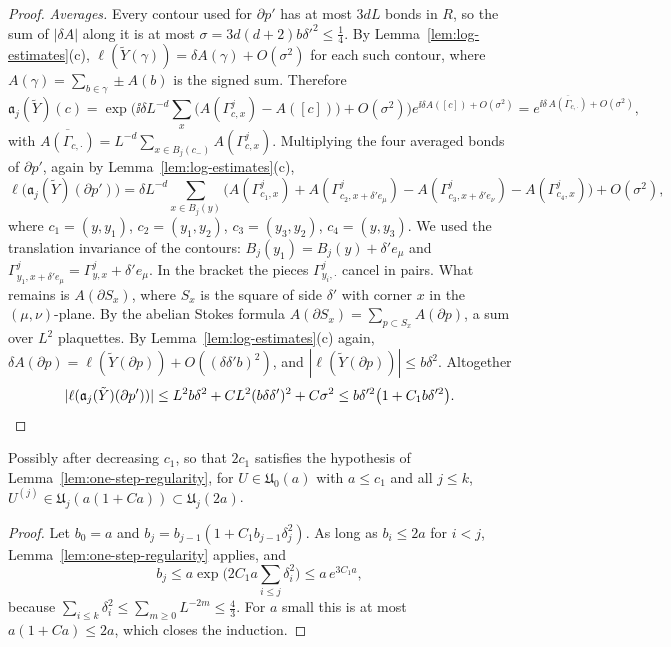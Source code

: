 \begin{proof}
\emph{Averages.} Every contour used for $\partial p'$ has at most $3dL$ bonds in $R$, so the sum of $|\delta A|$ along it is at most $\sigma=3d(d+2)b\delta'^2\le\frac14$. By Lemma~\ref{lem:log-estimates}(c), $\ell(\tilde Y(\gamma))=\delta A(\gamma)+O(\sigma^2)$ for each such contour, where $A(\gamma)=\sum_{b\in\gamma}\pm A(b)$ is the signed sum. Therefore
\[
\mathfrak a_j(\tilde Y)(c)=\exp\Big(\ii\delta L^{-d}\sum_{x}\big(A(\Gamma^j_{c,x})-A([c])\big)+O(\sigma^2)\Big)e^{\ii\delta A([c])+O(\sigma^2)}=e^{\ii\delta\,\overline{A(\Gamma_{c,\cdot})}+O(\sigma^2)},
\]
with $\overline{A(\Gamma_{c,\cdot})}=L^{-d}\sum_{x\in B_j(c_-)}A(\Gamma^j_{c,x})$. Multiplying the four averaged bonds of $\partial p'$, again by Lemma~\ref{lem:log-estimates}(c),
\[
\ell\big(\mathfrak a_j(\tilde Y)(\partial p')\big)=\delta L^{-d}\sum_{x\in B_j(y)}\Big(A(\Gamma^j_{c_1,x})+A(\Gamma^j_{c_2,x+\delta'e_\mu})-A(\Gamma^j_{c_3,x+\delta'e_\nu})-A(\Gamma^j_{c_4,x})\Big)+O(\sigma^2),
\]
where $c_1=(y,y_1)$, $c_2=(y_1,y_2)$, $c_3=(y_3,y_2)$, $c_4=(y,y_3)$. We used the translation invariance of the contours: $B_j(y_1)=B_j(y)+\delta'e_\mu$ and $\Gamma^j_{y_1,x+\delta'e_\mu}=\Gamma^j_{y,x}+\delta'e_\mu$. In the bracket the pieces $\Gamma^j_{y_i,\cdot}$ cancel in pairs. What remains is $A(\partial S_x)$, where $S_x$ is the square of side $\delta'$ with corner $x$ in the $(\mu,\nu)$-plane. By the abelian Stokes formula $A(\partial S_x)=\sum_{p\subset S_x}A(\partial p)$, a sum over $L^2$ plaquettes. By Lemma~\ref{lem:log-estimates}(c) again, $\delta A(\partial p)=\ell(\tilde Y(\partial p))+O((\delta\delta'b)^2)$, and $|\ell(\tilde Y(\partial p))|\le b\delta^2$. Altogether
\[
|\ell(\mathfrak a_j(\tilde Y)(\partial p'))|\le L^2b\delta^2+CL^2(b\delta\delta')^2+C\sigma^2\le b\delta'^2\big(1+C_1b\delta'^2\big).\qedhere
\]
\end{proof}

\begin{proposition}\label{prop:avg-regular}
Possibly after decreasing $c_1$, so that $2c_1$ satisfies the hypothesis of Lemma~\ref{lem:one-step-regularity}, for $U\in\mathfrak U_0(a)$ with $a\le c_1$ and all $j\le k$, $U^{(j)}\in\mathfrak U_j(a(1+Ca))\subset\mathfrak U_j(2a)$.
\end{proposition}

\begin{proof}
Let $b_0=a$ and $b_j=b_{j-1}(1+C_1b_{j-1}\delta_j^2)$. As long as $b_{i}\le2a$ for $i<j$, Lemma~\ref{lem:one-step-regularity} applies, and
\[
b_j\le a\exp\Big(2C_1a\sum_{i\le j}\delta_i^2\Big)\le a\,e^{3C_1a},
\]
because $\sum_{i\le k}\delta_i^2\le\sum_{m\ge0}L^{-2m}\le\frac43$. For $a$ small this is at most $a(1+Ca)\le2a$, which closes the induction.
\end{proof}

